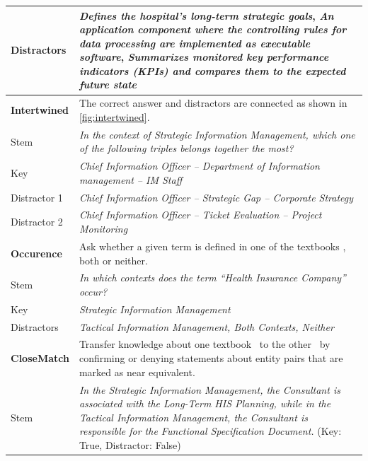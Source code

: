 \documentclass{IOS-Book-Article}     %
\newcommand{\citep}{\cite}%
\begin{document}
\begin{table}[t]
\begin{tabulary}{\columnwidth}{lL}
Distractors				&\emph{Defines the hospital’s long-term strategic goals},
						\emph{An application component where the controlling rules for data processing are implemented as executable software},
						\emph{Summarizes monitored key performance indicators (KPIs) and compares them to the expected future state}\\
\midrule
\textbf{Intertwined}	&The correct answer and distractors are connected as shown in \cref{fig:intertwined}.\\
Stem					&\emph{In the context of Strategic Information Management, which one of the following triples belongs together the most?}\\
Key						&\emph{Chief Information Officer -- Department of Information management -- IM Staff}\\
Distractor 1			&\emph{Chief Information Officer -- Strategic Gap -- Corporate Strategy}\\
Distractor 2			&\emph{Chief Information Officer -- Ticket Evaluation -- Project Monitoring}\\
\midrule
\textbf{Occurence}		&Ask whether a given term is defined in one of the textbooks \cite{bb,ob}, both or neither.\\
Stem					&\emph{In which contexts does the term \enquote{Health Insurance Company} occur?}\\
Key						&\emph{Strategic Information Management}\\
Distractors				&\emph{Tactical Information Management, Both Contexts, Neither}\\
\midrule
\textbf{CloseMatch}		&Transfer knowledge about one textbook~\citep{bb} to the other~\citep{ob} by confirming or denying statements about entity pairs that are marked as near equivalent.\\
Stem					&\emph{In the Strategic Information Management, the Consultant is associated with the Long-Term HIS Planning, while in the Tactical Information Management, the Consultant is responsible for the Functional Specification Document.} (Key: True, Distractor: False)\\
\bottomrule
\end{tabulary}
\end{table}
%
\end{document}
